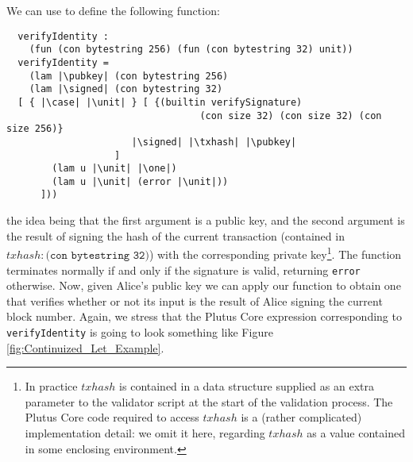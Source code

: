 \documentclass[../plutus-core-specification.tex]{subfiles}
\begin{document}
\noindent We can use \case{} to define the following function:
\begin{lstlisting}
  verifyIdentity :
    (fun (con bytestring 256) (fun (con bytestring 32) unit))
  verifyIdentity =
    (lam |\pubkey| (con bytestring 256)
    (lam |\signed| (con bytestring 32)
  [ { |\case| |\unit| } [ {(builtin verifySignature)
                                  (con size 32) (con size 32) (con size 256)}
                      |\signed| |\txhash| |\pubkey|
                   ]
        (lam u |\unit| |\one|)
        (lam u |\unit| (error |\unit|))
      ]))
\end{lstlisting}
the idea being that the first argument is a public key, and the second
argument is the result of signing the hash of the current transaction
(contained in $\mathit{txhash} : \texttt{(con bytestring 32)}$) with
the corresponding private key\footnote{In practice $\mathit{txhash}$
  is contained in a data structure supplied as an extra parameter to
  the validator script at the start of the validation process.  The
  Plutus Core code required to access $\mathit{txhash}$ is a (rather
  complicated) implementation detail: we omit it here, regarding
  $\mathit{txhash}$ as a value contained in some enclosing
  environment.}.  The function terminates normally if and only if the
signature is valid, returning \texttt{error} otherwise. Now, given
Alice's public key we can apply our function to obtain one that
verifies whether or not its input is the result of Alice signing the
current block number. Again, we stress that the Plutus Core expression
corresponding to \texttt{verifyIdentity} is going to look something
like Figure \ref{fig:Continuized_Let_Example}.



\end{document}
